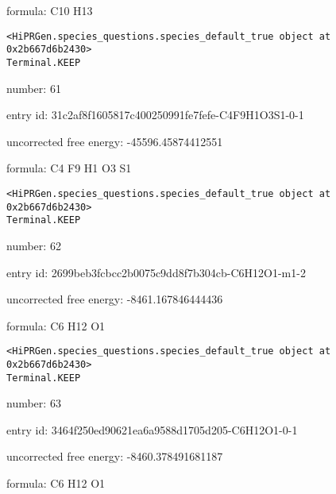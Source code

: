\documentclass{article}
\begin{document}
formula: C10 H13


\vspace{1cm}
\begin{verbatim}
<HiPRGen.species_questions.species_default_true object at 0x2b667d6b2430>
Terminal.KEEP
\end{verbatim}


number: 61



entry id: 31c2af8f1605817c400250991fe7fefe-C4F9H1O3S1-0-1



uncorrected free energy: -45596.45874412551



formula: C4 F9 H1 O3 S1


\vspace{1cm}
\begin{verbatim}
<HiPRGen.species_questions.species_default_true object at 0x2b667d6b2430>
Terminal.KEEP
\end{verbatim}


number: 62



entry id: 2699beb3fcbcc2b0075c9dd8f7b304cb-C6H12O1-m1-2



uncorrected free energy: -8461.167846444436



formula: C6 H12 O1


\vspace{1cm}
\begin{verbatim}
<HiPRGen.species_questions.species_default_true object at 0x2b667d6b2430>
Terminal.KEEP
\end{verbatim}


number: 63



entry id: 3464f250ed90621ea6a9588d1705d205-C6H12O1-0-1



uncorrected free energy: -8460.378491681187



formula: C6 H12 O1

\end{document}
